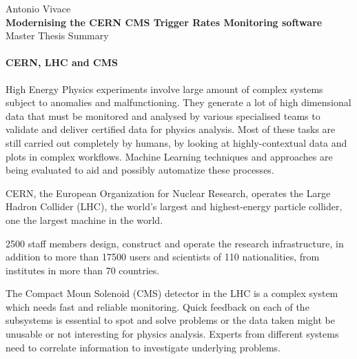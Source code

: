 \documentclass[a4, oneside, 11pt, nobib]{memoir}
\begin{document}
\thispagestyle{empty}

\begin{center}

	{\Large Antonio Vivace}
	\\
	\vspace{8mm}
	{\Huge \textbf{Modernising the CERN CMS Trigger Rates Monitoring software}}
	\\
	\vspace{8mm}
	{\huge Master Thesis Summary}
\end{center}

\pagebreak
\setcounter{page}{1}

		\paragraph{CERN, LHC and CMS} High Energy Physics experiments involve large amount of complex systems subject to anomalies and malfunctioning. They generate a lot of high dimensional data that must be monitored and analysed by various specialised teams to validate and deliver certified data for physics analysis. Most of these tasks are still carried out completely by humans, by looking at highly-contextual data and plots in complex workflows. Machine Learning techniques and approaches are being evaluated to aid and possibly automatize these processes.

		CERN, the European Organization for Nuclear Research, operates the Large Hadron Collider (LHC), the world's largest and highest-energy particle collider, one the largest machine in the world.

		2500 staff members design, construct and operate the research infrastructure, in addition to more than 17500 users and scientists of 110 nationalities, from institutes in more than 70 countries.

		The Compact Moun Solenoid (CMS) detector in the LHC is a complex system which needs fast and reliable monitoring. Quick feedback on each of the subsystems is essential to spot and solve problems or the data taken might be unusable or not interesting for physics analysis. Experts from different systems need to correlate information to investigate underlying problems.
\end{document}
